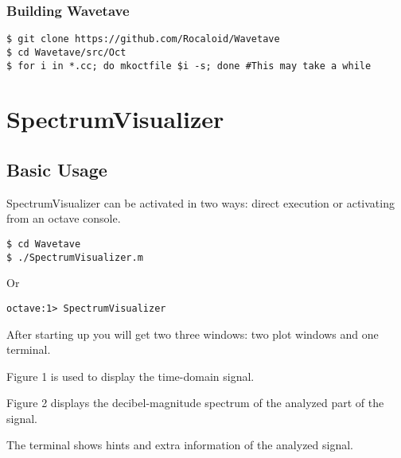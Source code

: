         \subsubsection{Building Wavetave}\indent
        
        \lstset{language = bash, tabsize = 4}
        
        \begin{lstlisting}
$ git clone https://github.com/Rocaloid/Wavetave
$ cd Wavetave/src/Oct
$ for i in *.cc; do mkoctfile $i -s; done #This may take a while
        \end{lstlisting}

\section{SpectrumVisualizer}

\subsection{Basic Usage}\indent

        SpectrumVisualizer can be activated in two ways: direct execution or activating from an octave console.
        
        \lstset{language = bash, tabsize = 4}
        \begin{lstlisting}
$ cd Wavetave
$ ./SpectrumVisualizer.m
        \end{lstlisting}
        
        Or
        
        \lstset{language = octave, tabsize = 8}
        \begin{lstlisting}
octave:1> SpectrumVisualizer
        \end{lstlisting}
        
        \bigskip
        
        After starting up you will get two three windows: two plot windows and one terminal.
        
        Figure 1 is used to display the time-domain signal.
        
        Figure 2 displays the decibel-magnitude spectrum of the analyzed part of the signal.
        
        The terminal shows hints and extra information of the analyzed signal.
        
        \newpage
        
        
